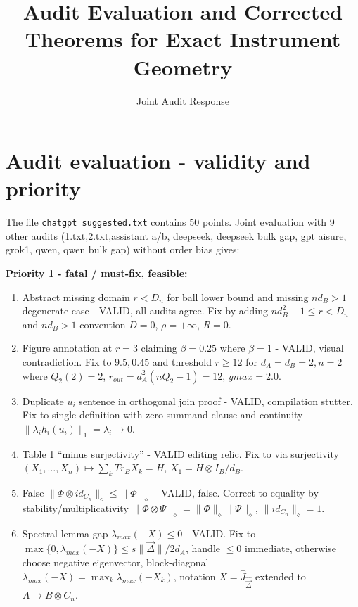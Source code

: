 \documentclass[11pt,a4paper]{article}
\title{Audit Evaluation and Corrected Theorems for Exact Instrument Geometry}
\author{Joint Audit Response}
\date{}
\begin{document}
\maketitle

\section{Audit evaluation - validity and priority}

The file \texttt{chatgpt suggested.txt} contains 50 points. Joint evaluation with 9 other audits (1.txt,2.txt,assistant a/b, deepseek, deepseek bulk gap, gpt aisure, grok1, qwen, qwen bulk gap) without order bias gives:

\textbf{Priority 1 - fatal / must-fix, feasible:}
\begin{enumerate}
\item Abstract missing domain $r<D_n$ for ball lower bound and missing $nd_B>1$ degenerate case - VALID, all audits agree. Fix by adding $nd_B^2-1\le r<D_n$ and $nd_B>1$ convention $D=0$, $\rho=+\infty$, $R=0$.
\item Figure annotation at $r=3$ claiming $\beta=0.25$ where $\beta=1$ - VALID, visual contradiction. Fix to $9.5,0.45$ and threshold $r\ge12$ for $d_A=d_B=2,n=2$ where $Q_2(2)=2$, $r_{out}=d_A^2(nQ_2-1)=12$, $ymax=2.0$.
\item Duplicate $u_i$ sentence in orthogonal join proof - VALID, compilation stutter. Fix to single definition with zero-summand clause and continuity $\|\lambda_i h_i(u_i)\|_1=\lambda_i\to0$.
\item Table 1 ``minus surjectivity'' - VALID editing relic. Fix to via surjectivity $(X_1,\dots,X_n)\mapsto\sum_kTr_BX_k=H$, $X_1=H\otimes I_B/d_B$.
\item False $\|\Phi\otimes id_{C_n}\|_\diamond\le\|\Phi\|_\diamond$ - VALID, false. Correct to equality by stability/multiplicativity $\|\Phi\otimes\Psi\|_\diamond=\|\Phi\|_\diamond\|\Psi\|_\diamond$, $\|id_{C_n}\|_\diamond=1$.
\item Spectral lemma gap $\lambda_{max}(-X)\le0$ - VALID. Fix to $\max\{0,\lambda_{max}(-X)\}\le s\|\vec\Delta\|/2d_A$, handle $\le0$ immediate, otherwise choose negative eigenvector, block-diagonal $\lambda_{max}(-X)=\max_k\lambda_{max}(-X_k)$, notation $X=\widehat J_{\widehat{\vec\Delta}}$ extended to $A\to B\otimes C_n$.
\end{enumerate}
\end{document}
